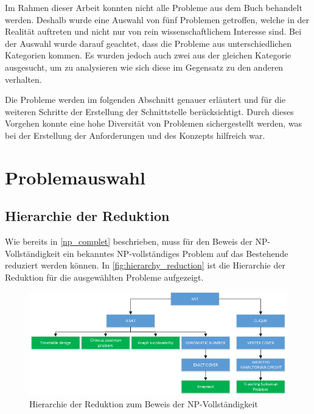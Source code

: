 Im Rahmen dieser Arbeit konnten nicht alle Probleme aus dem Buch behandelt werden. Deshalb wurde eine Auswahl von fünf Problemen getroffen, welche in der Realität auftreten und nicht 
nur von rein wissenschaftlichem Interesse sind. Bei der Auswahl wurde darauf geachtet, dass die Probleme aus unterschiedlichen Kategorien kommen. Es wurden jedoch auch zwei aus der 
gleichen Kategorie ausgesucht, um zu analysieren wie sich diese im Gegensatz zu den anderen verhalten. 

Die Probleme werden im folgenden Abschnitt genauer erläutert und für die weiteren Schritte der Erstellung der Schnittstelle berücksichtigt. Durch dieses Vorgehen konnte eine 
hohe Diversität von Problemen sichergestellt werden, was bei der Erstellung der Anforderungen und des Konzepts hilfreich war.

\section{Problemauswahl}\label{problem_selection}

\subsection{Hierarchie der Reduktion}\label{hierarchy_reduction}
Wie bereits in \ref{np_complet} beschrieben, muss für den Beweis der NP-Vollständigkeit ein bekanntes NP-vollständiges Problem auf das Bestehende reduziert werden können. In 
\autoref{fig:hierarchy_reduction} ist die Hierarchie der Reduktion für die ausgewählten Probleme aufgezeigt.

\begin{figure}[h]
\centering 
\includegraphics[scale=0.75]{images/visio/problem_hierarchy.png}
\caption[Hierarchie der Reduktion zum Beweis der NP-Vollständigkeit]{Hierarchie der Reduktion zum Beweis der NP-Vollständigkeit }
\label{fig:hierarchy_reduction}
\end{figure}

